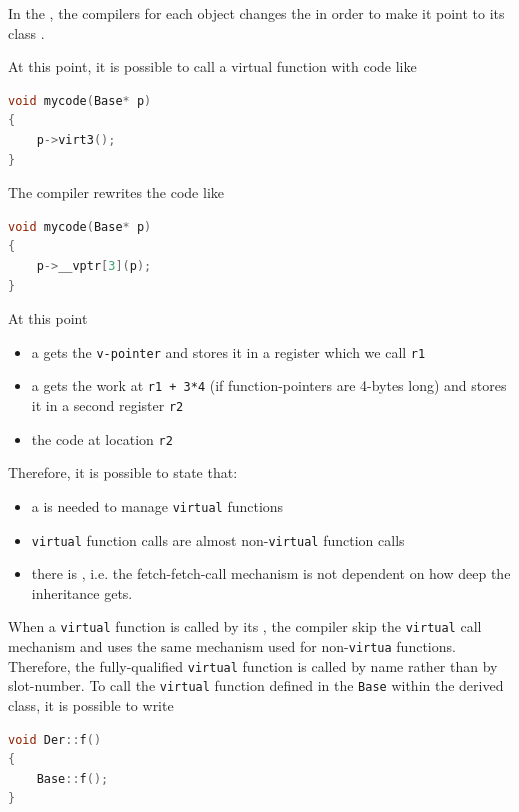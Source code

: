 In the , the compilers for each  
object changes the  in order to make it point to its 
class .

At this point, it is possible to call a virtual function with code like
\begin{lstlisting}[language=C++]
void mycode(Base* p)
{
    p->virt3();
}
\end{lstlisting}
The compiler rewrites the code like
\begin{lstlisting}[language=C++]
void mycode(Base* p)
{
    p->__vptr[3](p);
}
\end{lstlisting}
At this point
\begin{itemize}
    \item a  gets the \texttt{v-pointer} and stores it in a 
          register which we call \texttt{r1}
    \item a  gets the work at \texttt{r1 + 3*4} (if 
          function-pointers are 4-bytes long) and stores it in a second 
          register \texttt{r2}
    \item {} the code at location \texttt{r2}
\end{itemize}

Therefore, it is possible to state that:
\begin{itemize}
    \item a  is needed to manage \texttt{virtual} 
          functions
    \item \texttt{virtual} function calls are almost  
          non-\texttt{virtual} function calls
    \item there is , i.e. the fetch-fetch-call 
          mechanism is not dependent on how deep the inheritance gets.
\end{itemize}

When a \texttt{virtual} function is called by its , 
the compiler skip the \texttt{virtual} call mechanism and uses the same 
mechanism used for non-\texttt{virtua} functions. Therefore, the 
fully-qualified \texttt{virtual} function is called by name rather than 
by slot-number.
\newline
To call the \texttt{virtual} function defined in the \texttt{Base} 
within the derived class, it is possible to write
\begin{lstlisting}[language=C++]
void Der::f()
{
    Base::f();
}
\end{lstlisting}

